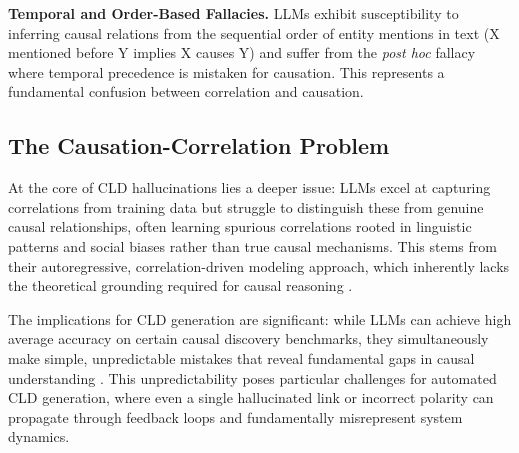 \documentclass[12pt,a4paper]{article}
\begin{document}
\textbf{Temporal and Order-Based Fallacies.} LLMs exhibit susceptibility to inferring causal relations from the sequential order of entity mentions in text (X mentioned before Y implies X causes Y) and suffer from the \textit{post hoc} fallacy where temporal precedence is mistaken for causation. This represents a fundamental confusion between correlation and causation.

\subsection{The Causation-Correlation Problem}

At the core of CLD hallucinations lies a deeper issue: LLMs excel at capturing correlations from training data but struggle to distinguish these from genuine causal relationships, often learning spurious correlations rooted in linguistic patterns and social biases rather than true causal mechanisms. This stems from their autoregressive, correlation-driven modeling approach, which inherently lacks the theoretical grounding required for causal reasoning \parencite{wu2025llmdiscovercausalityrestricted}.

The implications for CLD generation are significant: while LLMs can achieve high average accuracy on certain causal discovery benchmarks, they simultaneously make simple, unpredictable mistakes that reveal fundamental gaps in causal understanding \parencite{kiciman2024causal}. This unpredictability poses particular challenges for automated CLD generation, where even a single hallucinated link or incorrect polarity can propagate through feedback loops and fundamentally misrepresent system dynamics.

\printbibliography
\end{document}
